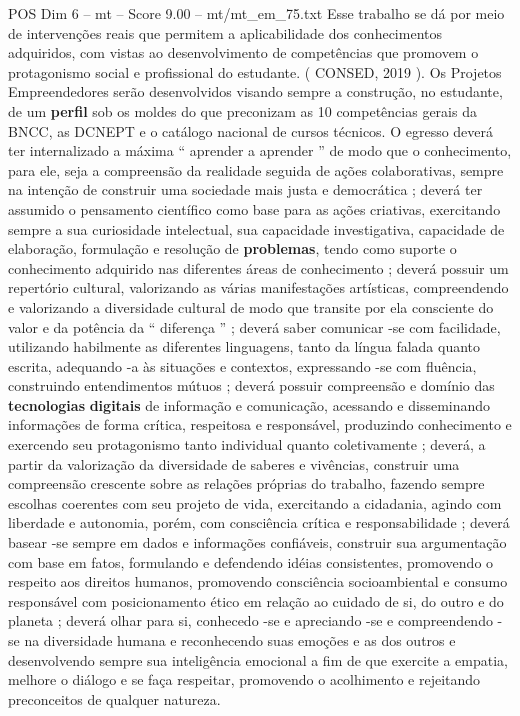 \begin{textsample}{POS Dim 6 – mt – Score 9.00 – mt/mt\_em\_75.txt}
Esse trabalho se dá por meio de intervenções reais que permitem a aplicabilidade dos conhecimentos adquiridos, com vistas ao desenvolvimento de competências que promovem o protagonismo social e profissional do estudante. ( CONSED, 2019 ).
Os Projetos Empreendedores serão desenvolvidos visando sempre a construção, no estudante, de um \textbf{perfil} sob os moldes do que preconizam as 10 competências gerais da BNCC, as DCNEPT e o catálogo nacional de cursos técnicos.
O egresso deverá ter internalizado a máxima “ aprender a aprender ” de modo que o conhecimento, para ele, seja a compreensão da realidade seguida de ações colaborativas, sempre na intenção de construir uma sociedade mais justa e democrática ; deverá ter assumido o pensamento científico como base para as ações criativas, exercitando sempre a sua curiosidade intelectual, sua capacidade investigativa, capacidade de elaboração, formulação e resolução de \textbf{problemas}, tendo como suporte o conhecimento adquirido nas diferentes áreas de conhecimento ; deverá possuir um repertório cultural, valorizando as várias manifestações artísticas, compreendendo e valorizando a diversidade cultural de modo que transite por ela consciente do valor e da potência da “ diferença ” ; deverá saber comunicar -se com facilidade, utilizando habilmente as diferentes linguagens, tanto da língua falada quanto escrita, adequando -a às situações e contextos, expressando -se com fluência, construindo entendimentos mútuos ; deverá possuir compreensão e domínio das \textbf{tecnologias} \textbf{digitais} de informação e comunicação, acessando e disseminando informações de forma crítica, respeitosa e responsável, produzindo conhecimento e exercendo seu protagonismo tanto individual quanto coletivamente ; deverá, a partir da valorização da diversidade de saberes e vivências, construir uma compreensão crescente sobre as relações próprias do trabalho, fazendo sempre escolhas coerentes com seu projeto de vida, exercitando a cidadania, agindo com liberdade e autonomia, porém, com consciência crítica e responsabilidade ; deverá basear -se sempre em dados e informações confiáveis, construir sua argumentação com base em fatos, formulando e defendendo idéias consistentes, promovendo o respeito aos direitos humanos, promovendo consciência socioambiental e consumo responsável com posicionamento ético em relação ao cuidado de si, do outro e do planeta ; deverá olhar para si, conhecedo -se e apreciando -se e compreendendo -se na diversidade humana e reconhecendo suas emoções e as dos outros e desenvolvendo sempre sua inteligência emocional a fim de que exercite a empatia, melhore o diálogo e se faça respeitar, promovendo o acolhimento e rejeitando preconceitos de qualquer natureza.

\end{textsample}
